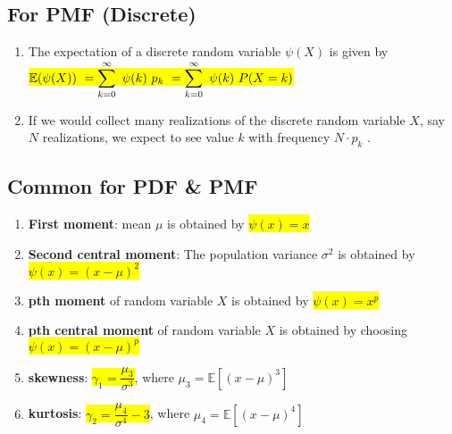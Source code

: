 \subsection{For PMF (Discrete)}

\begin{enumerate}
    \item The expectation of a discrete random variable $\psi(X)$ is given by
    \hfill \cite{statistics/book/Statistics-for-Data-Scientists/Maurits-Kaptein}
    \\[0.2cm]
    \colorbox{yellow}{$
        \mathbb{E} (\psi(X)) \
        = \displaystyle\sum^{\infty}_{k=0}\ \psi(k)\ p _k \
        = \displaystyle\sum^{\infty}_{k=0}\ \psi(k)\ P(X = k)
    $}
    \hfill \cite{statistics/book/Statistics-for-Data-Scientists/Maurits-Kaptein}

    \item If we would collect many realizations of the discrete random variable $X$, say $N$ realizations, we expect to see value $k$ with frequency $N \cdot p _k$ .
    \hfill \cite{statistics/book/Statistics-for-Data-Scientists/Maurits-Kaptein}
\end{enumerate}

\subsection{Common for PDF \& PMF}

\begin{enumerate}
    \item \textbf{First moment}: mean $\mu$ is obtained by \colorbox{yellow}{$\psi(x)=x$}
    \hfill \cite{statistics/book/Statistics-for-Data-Scientists/Maurits-Kaptein}

    \item \textbf{Second central moment}: The population variance $\sigma^ 2$ is obtained by \colorbox{yellow}{$\psi(x)=(x -\mu)^2$}
    \hfill \cite{statistics/book/Statistics-for-Data-Scientists/Maurits-Kaptein}

    \item \textbf{pth moment} of random variable $X$ is obtained by \colorbox{yellow}{$\psi(x) = x^p$}
    \hfill \cite{statistics/book/Statistics-for-Data-Scientists/Maurits-Kaptein}

    \item \textbf{pth central moment} of random variable $X$ is obtained by choosing \colorbox{yellow}{$\psi(x) = (x - \mu)^p$}
    \hfill \cite{statistics/book/Statistics-for-Data-Scientists/Maurits-Kaptein}

    \item \textbf{skewness}: \colorbox{yellow}{$\gamma_1 = \dfrac{\mu_3}{\sigma^3}$}, where $\mu_3 = \mathbb{E}[(x-\mu)^3]$
    \hfill \cite{statistics/book/Statistics-for-Data-Scientists/Maurits-Kaptein}

    \item \textbf{kurtosis}: \colorbox{yellow}{$\gamma_2 = \dfrac{\mu_4}{\sigma^4} - 3$}, where $\mu_4 = \mathbb{E}[(x-\mu)^4]$
    \hfill \cite{statistics/book/Statistics-for-Data-Scientists/Maurits-Kaptein}
\end{enumerate}

